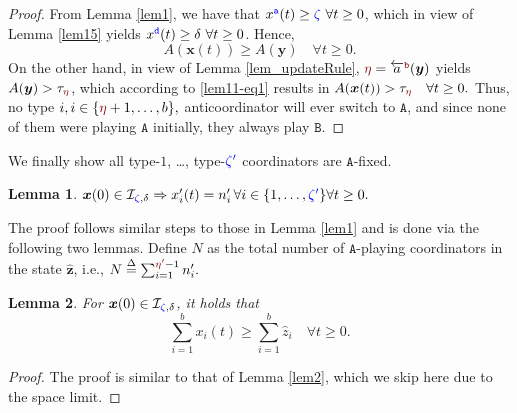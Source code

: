 \documentclass[10 pt,twocolumn,journal]{IEEEtran}
\theoremstyle{plain}
\newtheorem{lemma}{Lemma}
\newcommand{\db}{\overset{\Delta}{=}}
\newcommand{\A}{\mathcal{A}}
\newcommand{\I}{\mathcal{I}}
\newcommand{\x}{\bm{x}}
\newcommand{\y}{\bm{y}}
\newcommand{\z}{\bm{z}}
\renewcommand{\r}{\tb{\zeta}}
\newcommand{\rr}{\tb{\zeta'}}
\newcommand{\s}{\tr{\eta}}
\renewcommand{\ss}{\tr{\eta'}}
\renewcommand{\d}{{\delta}}
\newcommand{\n}{\tb{\mathtt{a}}}
\renewcommand{\o}{\tr{\mathtt{b}}}
\newcommand{\nn}{\tb{\mathtt{d}}}
\renewcommand{\A}{\mathtt{A}}
\newcommand{\B}{\mathtt{B}}
\newcommand{\tb}{\textcolor{blue}}
\newcommand{\tr}{\textcolor{Myred}}
\theoremstyle{definition}
\begin{document}
\begin{proof}
    From Lemma \ref{lem1}, we have that 
    $
        x^{\n}(t) \geq \r\  \forall t\geq 0
    $,
    which in view of Lemma \ref{lem15} yields
    $
        x^{\nn}(t) \geq \d\  \forall t\geq 0
    $.
    Hence, 
    \begin{equation} \label{lem11-eq1}
        A(\x(t)) 
        \geq A(\y) \quad \forall t\geq0.
    \end{equation}
    On the other hand, in view of Lemma \ref{lem_updateRule}, $\s = \overleftarrow{a}^{\o}(\y)$ yields
    $
        A(\y) > \tau_{\s}
    $,
    which according to \eqref{lem11-eq1} results in
    $
        A(\x(t)) 
        > \tau_{\s} \quad \forall t\geq0.
    $    
    Thus, no type $i, i\in\{\s+1, \ldots, b\},$ anticoordinator will ever switch to $\A$, and since none of them were playing $\A$ initially, they always play $\B$.
\end{proof}
We finally show all type-$1$, \ldots, type-$\rr$ coordinators are $\A$-fixed.
%
\begin{lemma}   \label{lem7}
    $
       \x(0)\in\I_{\r,\d} \Rightarrow x'_i(t) = n'_i \,\forall i\in\{1,\ldots, \rr\}\forall t\geq 0.
    $
\end{lemma}
The proof follows similar steps to those in Lemma \ref{lem1} and is done via the following two lemmas. 
Define $N$ as the total number of $\A$-playing coordinators in the state $\hat{\z}$, i.e., 
$
    N \db \sum_{i = 1}^{\ss-1} n'_i.
$
\begin{lemma}   \label{lem12}
    For $\x(0)\in\I_{\r,\d}$, it holds that
    \begin{equation*}
         \sum_{i=1}^b x_i(t) \geq \sum_{i=1}^b\hat{z}_i \quad \forall t\geq 0. 
    \end{equation*}
\end{lemma}
\begin{proof}
    The proof is similar to that of Lemma \ref{lem2}, which we skip here due to the space limit.
\end{proof}
    
\end{document}
